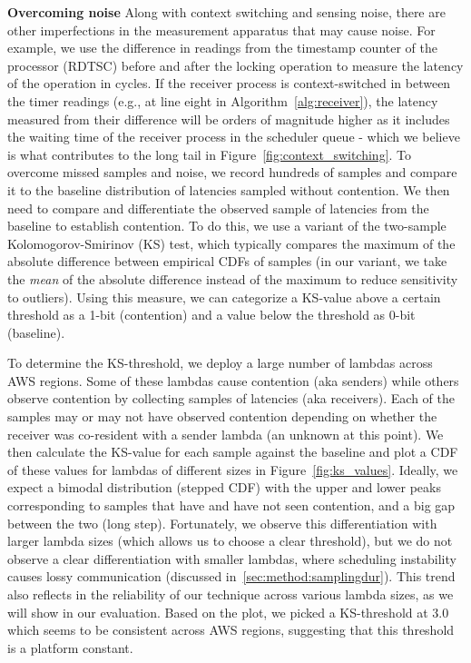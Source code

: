 \textbf{Overcoming noise} 
\label{sec:method:noise}
Along with context switching and sensing noise, there are other imperfections in
the measurement apparatus that may cause noise. For example, we use the
difference in readings from the timestamp counter of the processor (RDTSC)
before and after the locking operation to measure the latency of the operation
in cycles. If the receiver process is context-switched in between the timer
readings (e.g., at line eight in Algorithm~\ref{alg:receiver}), the latency
measured from their difference will be orders of magnitude higher as it includes
the waiting time of the receiver process in the scheduler queue - which we
believe is what contributes to the long tail in
Figure~\ref{fig:context_switching}. To overcome missed samples and noise, we
record hundreds of samples and compare it to the baseline distribution of
latencies sampled without contention. We then need to compare and differentiate
the observed sample of latencies from the baseline to establish contention. To
do this, we use a variant of the two-sample Kolomogorov-Smirinov (KS) test,
which typically compares the maximum of the absolute difference between
empirical CDFs of samples (in our variant, we take the \emph{mean} of the
absolute difference instead of the maximum to reduce sensitivity to outliers). 
Using this measure, we can categorize a KS-value above a certain threshold as a 1-bit
(contention) and a value below the threshold as 0-bit (baseline).

To determine the KS-threshold, we deploy a large number of lambdas across AWS
regions. Some of these lambdas cause contention (aka senders) while others
observe contention by collecting samples of latencies (aka receivers). Each of
the samples may or may not have observed contention depending on whether the
receiver was co-resident with a sender lambda (an unknown at this point). We then
calculate the KS-value for each sample against the baseline and plot a CDF of
these values for lambdas of different sizes in Figure~\ref{fig:ks_values}.
Ideally, we expect a bimodal distribution (stepped CDF) with the upper and
lower peaks corresponding to samples that have and have not seen contention, and
a big gap between the two (long step). Fortunately, we observe this
differentiation with larger lambda sizes (which allows us to choose a clear
threshold), but we do not observe a clear differentiation with smaller lambdas,
where scheduling instability causes lossy communication (discussed
in~\ref{sec:method:samplingdur}).  This trend also reflects in the reliability
of our technique across various lambda sizes, as we will show in our evaluation.
Based on the plot, we picked a KS-threshold at 3.0 which seems to be consistent
across AWS regions, suggesting that this threshold is a platform constant.

